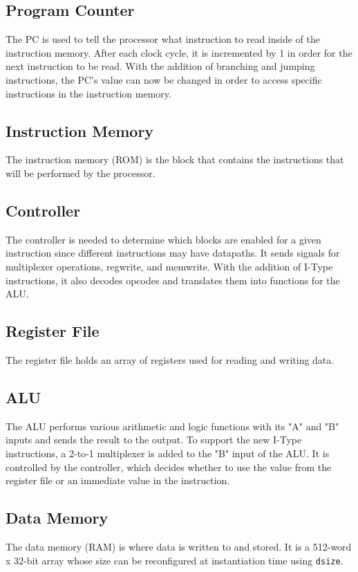 \documentclass{article}
\begin{document}
	\subsection{Program Counter}
	The PC is used to tell the processor what instruction to read inside of the instruction memory. After each clock cycle, it is incremented by 1 in order for the next instruction to be read. With the addition of branching and jumping instructions, the PC's value can now be changed in order to access specific instructions in the instruction memory.
	
	\subsection{Instruction Memory}
	The instruction memory (ROM) is the block that contains the instructions that will be performed by the processor. 
	
  \subsection{Controller}
	The controller is needed to determine which blocks are enabled for a given instruction since different instructions may have datapaths. It sends signals for multiplexer operations, regwrite, and memwrite. With the addition of I-Type instructions, it also decodes opcodes and translates them into functions for the ALU. 
	
	\subsection{Register File}
	The register file holds an array of registers used for reading and writing data.
	
	\subsection{ALU}
	The ALU performs various arithmetic and logic functions with its "A" and "B" inputs and sends the result to the output. To support the new I-Type instructions, a 2-to-1 multiplexer is added to the "B" input of the ALU. It is controlled by the controller, which decides whether to use the value from the register file or an immediate value in the instruction.
	
	\subsection{Data Memory}
	The data memory (RAM) is where data is written to and stored. It is a 512-word x 32-bit array whose size can be reconfigured at instantiation time using \texttt{dsize}.
		
\end{document}
